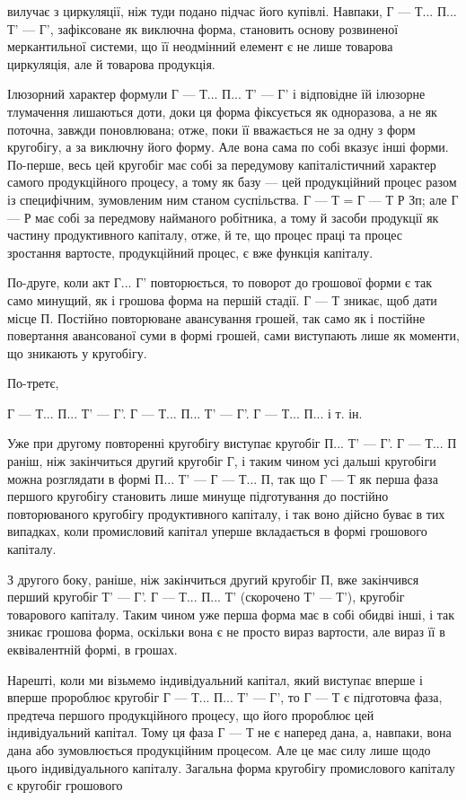 \parcont{}  %
вилучає з циркуляції, ніж туди подано підчас його купівлі. Навпаки,
Г — Т... П... Т' — Г', зафіксоване як виключна форма, становить основу
розвиненої меркантильної системи, що її неодмінний елемент є не лише
товарова циркуляція, але й товарова продукція.

Ілюзорний характер формули Г — Т... П... Т' — Г' і відповідне їй
ілюзорне тлумачення лишаються доти, доки ця форма фіксується як
одноразова, а не як поточна, завжди поновлювана; отже, поки її вважається
не за одну з форм кругобігу, а за виключну його форму. Але
вона сама по собі вказує інші форми.
По-перше, весь цей кругобіг має собі за передумову капіталістичний
характер самого продукційного процесу, а тому як базу — цей
продукційний процес разом із специфічним, зумовленим ним станом
суспільства. Г — Т = Г — Т Р Зп; але Г — Р має собі за передмову найманого робітника, а тому й
засоби продукції як частину продуктивного
капіталу, отже, й те, що процес праці та процес зростання вартосте,
продукційний процес, є вже функція капіталу.

По-друге, коли акт Г... Г' повторюється, то поворот до грошової
форми є так само минущий, як і грошова форма на першій стадії. Г — Т
зникає, щоб дати місце П. Постійно повторюване авансування грошей,
так само як і постійне повертання авансованої суми в формі грошей,
сами виступають лише як моменти, що зникають у кругобігу.

По-третє,

Г — Т... П... Т' — Г'. Г — Т... П... Т' — Г'. Г — Т... П... і т. ін.

Уже при другому повторенні кругобігу виступає кругобіг П... Т' — Г'.
Г — Т... П раніш, ніж закінчиться другий кругобіг Г, і таким чином
усі дальші кругобіги можна розглядати в формі П... Т' — Г — Т... П, так
що Г — Т як перша фаза першого кругобігу становить лише минуще підготування
до постійно повторюваного кругобігу продуктивного капіталу,
і так воно дійсно буває в тих випадках, коли промисловий капітал уперше
вкладається в формі грошового капіталу.

З другого боку, раніше, ніж закінчиться другий кругобіг П, вже
закінчився перший кругобіг Т' — Г'. Г — Т... П... Т' (скорочено Т' — Т'),
кругобіг товарового капіталу. Таким чином уже перша форма має в собі
обидві інші, і так зникає грошова форма, оскільки вона є не просто
вираз вартости, але вираз її в еквівалентній формі, в грошах.

Нарешті, коли ми візьмемо індивідуальний капітал, який виступає
вперше і вперше пророблює кругобіг Г — Т... П... Т' — Г', то
Г — Т є підготовча фаза, предтеча першого продукційного процесу, що
його пророблює цей індивідуальний капітал. Тому ця фаза Г — Т не є
наперед дана, а, навпаки, вона дана або зумовлюється продукційним
процесом. Але це має силу лише щодо цього індивідуального капіталу.
Загальна форма кругобігу промислового капіталу є кругобіг грошового
\parbreak{}  %
